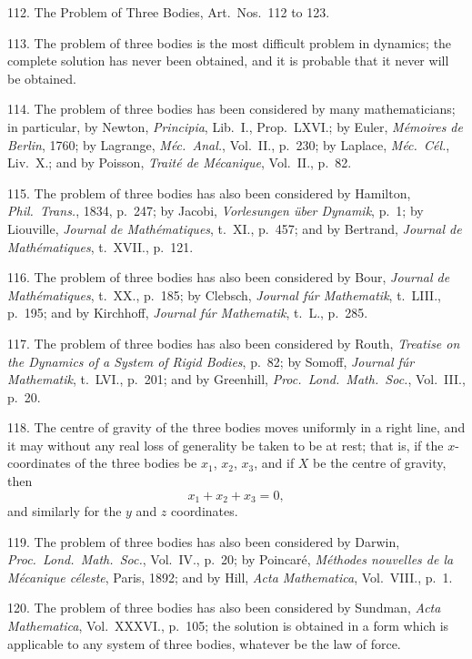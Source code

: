 \documentclass[11pt,a4paper]{book}
\begin{document}
112. The Problem of Three Bodies, Art.\ Nos.\ 112 to 123.

113. The problem of three bodies is the most difficult problem in dynamics; the complete solution has never been obtained, and it is probable that it never will be obtained.

114. The problem of three bodies has been considered by many mathematicians; in particular, by Newton, \textit{Principia}, Lib.~I., Prop.~LXVI.; by Euler, \textit{M\'emoires de Berlin}, 1760; by Lagrange, \textit{M\'ec.\ Anal.}, Vol.~II., p.~230; by Laplace, \textit{M\'ec.\ C\'el.}, Liv.~X.; and by Poisson, \textit{Trait\'e de M\'ecanique}, Vol.~II., p.~82.

115. The problem of three bodies has also been considered by Hamilton, \textit{Phil.\ Trans.}, 1834, p.~247; by Jacobi, \textit{Vorlesungen \"uber Dynamik}, p.~1; by Liouville, \textit{Journal de Math\'ematiques}, t.~XI., p.~457; and by Bertrand, \textit{Journal de Math\'ematiques}, t.~XVII., p.~121.

116. The problem of three bodies has also been considered by Bour, \textit{Journal de Math\'ematiques}, t.~XX., p.~185; by Clebsch, \textit{Journal f\'ur Mathematik}, t.~LIII., p.~195; and by Kirchhoff, \textit{Journal f\'ur Mathematik}, t.~L., p.~285.

117. The problem of three bodies has also been considered by Routh, \textit{Treatise on the Dynamics of a System of Rigid Bodies}, p.~82; by Somoff, \textit{Journal f\'ur Mathematik}, t.~LVI., p.~201; and by Greenhill, \textit{Proc.\ Lond.\ Math.\ Soc.}, Vol.~III., p.~20.

118. The centre of gravity of the three bodies moves uniformly in a right line, and it may without any real loss of generality be taken to be at rest; that is, if the $x$-coordinates of the three bodies be $x_1$, $x_2$, $x_3$, and if $X$ be the centre of gravity, then
\[
x_1 + x_2 + x_3 = 0,
\]
and similarly for the $y$ and $z$ coordinates.

119. The problem of three bodies has also been considered by Darwin, \textit{Proc.\ Lond.\ Math.\ Soc.}, Vol.~IV., p.~20; by Poincar\'e, \textit{M\'ethodes nouvelles de la M\'ecanique c\'eleste}, Paris, 1892; and by Hill, \textit{Acta Mathematica}, Vol.~VIII., p.~1.

120. The problem of three bodies has also been considered by Sundman, \textit{Acta Mathematica}, Vol.~XXXVI., p.~105; the solution is obtained in a form which is applicable to any system of three bodies, whatever be the law of force.
\end{document}
